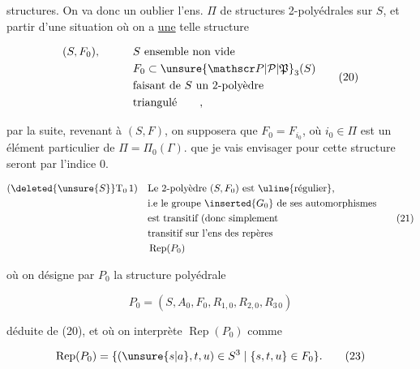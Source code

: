 
structures. On va donc  un   oublier l'ens. $\Pi$ de structures 2-polyédrales sur $S$, et  partir d'une situation où on a \uline{une} telle structure

\[
\begin{aligned}
 &(S,F_0),\qquad &&S\text{ ensemble non vide}\\
 &&&F_0\subset\unsure{\mathscr P|\mathcal P|\mathfrak P}_3(S)\\
 &&&\text{faisant de }S\text{ un 2-polyèdre}\\
 &&&\text{triangulé}\qquad,
\end{aligned}\tag*{(20)}
\]

par la suite, revenant à $(S,F)$, on supposera que $F_0=F_{i_0}$, où $i_0\in\Pi$ est un élément particulier de $\Pi=\Pi_0(\Gamma)$.  que je vais envisager pour cette structure seront  par l'indice $0$.

\[
\begin{aligned}
 (\deleted{\unsure{S}}\mathrm T_0\,1)\quad&\text{Le 2-polyèdre }(S,F_0)\text{ est \uline{régulier},}\\
 &\text{i.e le groupe }\inserted{G_0}\text{ de ses automorphismes}\\
 &\text{est transitif (donc simplement}\\
 &\text{transitif sur l'ens des repères}\\
 &\operatorname{Rep}(P_0)
\end{aligned}\tag*{(21)}
\]

où on désigne par $P_0$ la structure polyédrale

\[
P_0=(S,A_0,F_0,R_{1,0},R_{2,0},R_{3\,0})\tag*{(22)}
\]

déduite de (20), et où on interprète $\operatorname{Rep}(P_0)$ comme

\[
\operatorname{Rep}(P_0)=\{(\unsure{s|a},t,u)\in S^3\mid\{s,t,u\}\in F_0\}.\tag*{(23)}
\]
